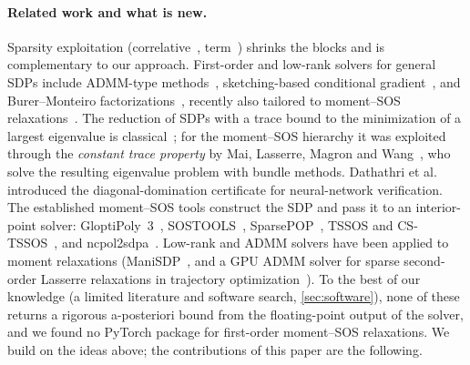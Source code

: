 \documentclass[a4paper,11pt]{article}
\theoremstyle{plain}
\theoremstyle{definition}
\theoremstyle{remark}
\begin{document}
\paragraph{Related work and what is new.}
Sparsity exploitation (correlative~\cite{waki2006,lasserre2006}, term~\cite{wang2021tssos,wang2022cstssos}) shrinks the blocks and is complementary to our approach. First-order and low-rank solvers for general SDPs include ADMM-type methods~\cite{odonoghue2016,zheng2020}, sketching-based conditional gradient~\cite{yurtsever2021}, and Burer--Monteiro factorizations~\cite{burer2003}, recently also tailored to moment--SOS relaxations~\cite{hou2025,wang2023manisdp}.
The reduction of SDPs with a trace bound to the minimization of a largest eigenvalue is classical~\cite{helmberg2000,lewis1996}; for the moment--SOS hierarchy it was exploited through the \emph{constant trace property} by Mai, Lasserre, Magron and Wang~\cite{mai2022ctp,mai2023spectral}, who solve the resulting eigenvalue problem with bundle methods. Dathathri et al.~\cite{dathathri2020} introduced the diagonal-domination certificate for neural-network verification.
The established moment--SOS tools construct the SDP and pass it to an interior-point solver: GloptiPoly~3~\cite{henrion2009}, SOSTOOLS~\cite{papachristodoulou2013}, SparsePOP~\cite{waki2008sparsepop}, TSSOS and CS-TSSOS~\cite{magron2021tssos,wang2022cstssos}, and ncpol2sdpa~\cite{wittek2015}. Low-rank and ADMM solvers have been applied to moment relaxations (ManiSDP~\cite{wang2023manisdp}, and a GPU ADMM solver for sparse second-order Lasserre relaxations in trajectory optimization~\cite{kang2024}). To the best of our knowledge (a limited literature and software search, \cref{sec:software}), none of these returns a rigorous a-posteriori bound from the floating-point output of the solver, and we found no PyTorch package for first-order moment--SOS relaxations. We build on the ideas above; the contributions of this paper are the following.
\end{document}
